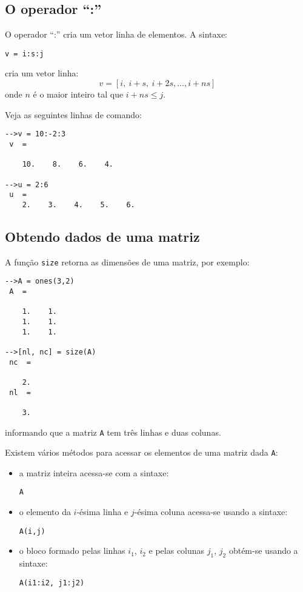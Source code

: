 \subsection{O operador ``:''}

O operador ``:'' cria um vetor linha de elementos. A sintaxe:
\begin{verbatim}
v = i:s:j
\end{verbatim}
cria um vetor linha:
\begin{equation*}
  v = [i,~i+s,~i+2s,\dotsc, i+ns]
\end{equation*}
onde $n$ é o maior inteiro tal que $i + ns \leq j$.

\begin{ex}
Veja as seguintes linhas de comando:
\begin{verbatim}
-->v = 10:-2:3
 v  =
 
    10.    8.    6.    4.  
 
-->u = 2:6
 u  =
    2.    3.    4.    5.    6.
\end{verbatim}
\end{ex}

\subsection{Obtendo dados de uma matriz}

A função \verb+size+ retorna as dimensões de uma matriz, por exemplo:
\begin{verbatim}
-->A = ones(3,2)
 A  =
 
    1.    1.  
    1.    1.  
    1.    1.  
 
-->[nl, nc] = size(A)
 nc  =
 
    2.  
 nl  =
 
    3.  
\end{verbatim}
informando que a matriz \verb+A+ tem três linhas e duas colunas.

Existem vários métodos para acessar os elementos de uma matriz dada \verb+A+:
\begin{itemize}
\item a matriz inteira acessa-se com a sintaxe:
\begin{verbatim}
A
\end{verbatim}
\item o elemento da $i$-ésima linha e $j$-ésima coluna acessa-se usando a sintaxe:
\begin{verbatim}
A(i,j)
\end{verbatim}
\item o bloco formado pelas linhas $i_1$, $i_2$ e pelas colunas $j_1$, $j_2$ obtém-se usando a sintaxe:
\begin{verbatim}
A(i1:i2, j1:j2)
\end{verbatim}
\end{itemize}

